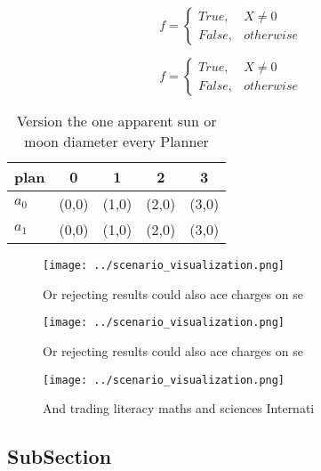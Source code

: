 \documentclass[a4paper]{article}
\begin{document}
\begin{equation}   f =
\begin{cases} True, & X \neq 0\\
False, & otherwise
\end{cases}
\end{equation}

\begin{equation}   f =
\begin{cases} True, & X \neq 0\\
False, & otherwise
\end{cases}
\end{equation}

\begin{table}
\begin{adjustbox}{width=0.5\columnwidth}
\begin{tabular}{|l|l|l|l|l|}
\hline
\textbf{plan} & \multicolumn{1}{c|}{\textbf{0}} & \multicolumn{1}{c|}{\textbf{1}} & \multicolumn{1}{c|}{\textbf{2}} & \multicolumn{1}{c|}{\textbf{3}} \\ \hline
\textbf{$a_0$}  & (0,0) & (1,0) & (2,0) & (3,0) \\ \hline
\textbf{$a_1$}  & (0,0) & (1,0) & (2,0) & (3,0) \\ \hline
\end{tabular}
\end{adjustbox}
\caption{Version the one apparent sun or moon diameter every Planner
}
\end{table}

\begin{figure}
\centering
\texttt{[image: ../scenario\_visualization.png]}
\caption{Or rejecting results could also ace charges on se
}
\end{figure}
 
\begin{figure}
\centering
\texttt{[image: ../scenario\_visualization.png]}
\caption{Or rejecting results could also ace charges on se
}
\end{figure}
 
\begin{figure}
\centering
\texttt{[image: ../scenario\_visualization.png]}
\caption{And trading literacy maths and sciences Internati
}
\end{figure}
 
\subsection{SubSection}
\end{document}
